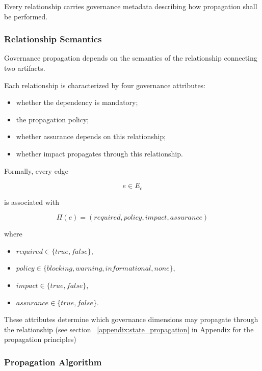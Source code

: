 \documentclass[10pt]{article}
\begin{document}
Every relationship carries governance metadata describing how propagation shall
be performed.

\subsubsection{Relationship Semantics}

Governance propagation depends on the semantics of the relationship connecting
two artifacts.

Each relationship is characterized by four governance attributes:

\begin{itemize}
    \item whether the dependency is mandatory;
    \item the propagation policy;
    \item whether assurance depends on this relationship;
    \item whether impact propagates through this relationship.
\end{itemize}

Formally, every edge

\[
e\in E_c
\]

is associated with

\begin{equation}
\Pi(e)=
(
required,
policy,
impact,
assurance
)
\label{eq:relationship_policy}
\end{equation}

where

\begin{itemize}
    \item $required\in\{true,false\}$,
    \item $policy\in
    \{
    blocking,
    warning,
    informational,
    none
    \}$,
    \item $impact\in\{true,false\}$,
    \item $assurance\in\{true,false\}$.
\end{itemize}

These attributes determine which governance dimensions may propagate through
the relationship (see section ~\ref{appendix:state_propagation} in Appendix for the propagation principles)

\subsubsection{Propagation Algorithm}
\end{document}
